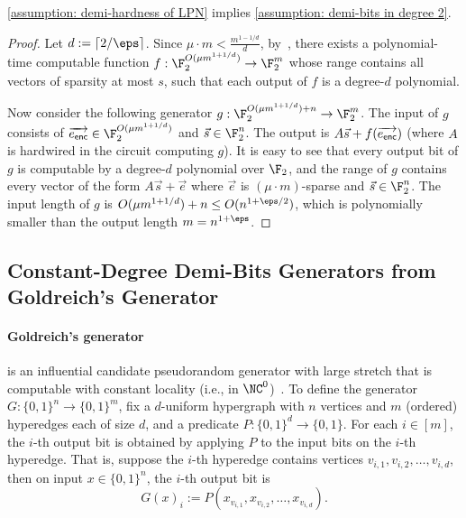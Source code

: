 \begin{fact}
    \autoref{assumption: demi-hardness of LPN} implies \autoref{assumption: demi-bits in degree 2}.
\end{fact}
\begin{proof}
    Let $d := \lceil 2/\eps\rceil$. Since $\mu\cdot m < \frac{m^{1-1/d}}{d}$, by~\cite[Lemma 3.1]{GajulapalliGNS23}, there exists a polynomial-time computable function $f: \F_2^{O(\mu m^{1+1/d})} \to \F_2^m$ whose range contains all vectors of sparsity at most $s$, such that each output of $f$ is a degree-$d$ polynomial.
    
    Now consider the following generator $g: \F_2^{O(\mu m^{1+1/d}) + n}\to \F_2^m$. The input of $g$ consists of $\overrightarrow{e_{\sf enc}} \in \F_2^{O(\mu m^{1+1/d})}$ and $\vec{s} \in \F_2^n$. The output is $A\vec{s} + f(\overrightarrow{e_{\sf enc}})$ (where $A$ is hardwired in the circuit computing $g$). It is easy to see that every output bit of $g$ is computable by a degree-$d$ polynomial over $\F_2$, and the range of $g$ contains every vector of the form $A\vec{s} + \vec{e}$ where $\vec{e}$ is $(\mu\cdot m)$-sparse and $\vec{s} \in \F_2^n$. The input length of $g$ is $O(\mu m^{1+1/d}) + n \le O(n^{1+\eps/2})$, which is polynomially smaller than the output length $m = n^{1+\eps}$.
\end{proof}

\subsection{Constant-Degree Demi-Bits Generators from Goldreich's Generator}

\paragraph{Goldreich's generator} is an influential candidate pseudorandom generator with large stretch that is computable with constant locality (i.e., in $\NC^0$)~\cite{Goldreich11-PRG}. To define the generator $G: \{0, 1\}^n \to \{0, 1\}^m$, fix a $d$-uniform hypergraph with $n$ vertices and $m$ (ordered) hyperedges each of size $d$, and a predicate $P: \{0, 1\}^d \to \{0, 1\}$. For each $i\in[m]$, the $i$-th output bit is obtained by applying $P$ to the input bits on the $i$-th hyperedge. That is, suppose the $i$-th hyperedge contains vertices $v_{i, 1}, v_{i, 2}, \dots, v_{i, d}$, then on input $x \in \{0, 1\}^n$, the $i$-th output bit is
\[G(x)_i := P(x_{v_{i, 1}}, x_{v_{i, 2}}, \dots, x_{v_{i, d}}).\]


